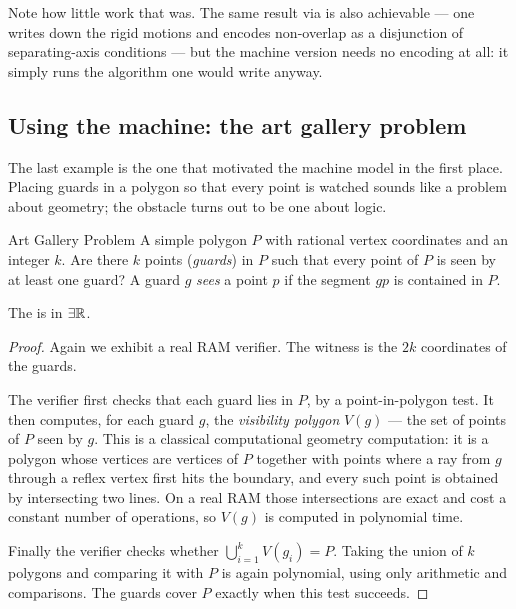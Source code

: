 Note how little work that was. The same result via \ETR{} is also achievable
--- one writes down the rigid motions and encodes non-overlap as a disjunction
of separating-axis conditions --- but the machine version needs no encoding at
all: it simply runs the algorithm one would write anyway.

\subsection{Using the machine: the art gallery problem}
\label{sec:er-membership-art-gallery}

The last example is the one that motivated the machine model in the first
place. Placing guards in a polygon so that every point is watched sounds like a
problem about geometry; the obstacle turns out to be one about logic.

\begin{probdef}{Art Gallery Problem}
  \instance A simple polygon $P$ with rational vertex coordinates and an
  integer $k$.
  \question Are there $k$ points (\emph{guards}) in $P$ such that every point of
  $P$ is seen by at least one guard? A guard $g$ \emph{sees} a point $p$ if the
  segment $gp$ is contained in $P$.
\end{probdef}

\begin{proposition}\label{prop:er-art-gallery}
The  is in $\exists\mathbb{R}$.
\end{proposition}

\begin{proof}
Again we exhibit a real RAM verifier. The witness is the $2k$ coordinates of
the guards.

The verifier first checks that each guard lies in $P$, by a point-in-polygon
test. It then computes, for each guard $g$, the \emph{visibility polygon}
$V(g)$ --- the set of points of $P$ seen by $g$. This is a classical
computational geometry computation: it is a polygon whose vertices are vertices
of $P$ together with points where a ray from $g$ through a reflex vertex first
hits the boundary, and every such point is obtained by intersecting two lines.
On a real RAM those intersections are exact and cost a constant number of
operations, so $V(g)$ is computed in polynomial time.

Finally the verifier checks whether $\bigcup_{i=1}^{k} V(g_i) = P$. Taking the
union of $k$ polygons and comparing it with $P$ is again polynomial, using only
arithmetic and comparisons. The guards cover $P$ exactly when this test
succeeds.
\end{proof}

